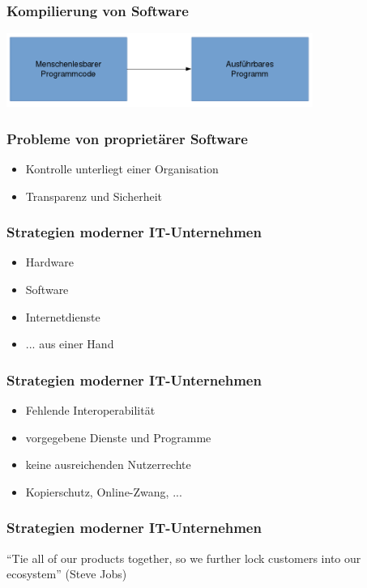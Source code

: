 \documentclass[12pt]{beamer}
\begin{document}
\begin{frame}
  \frametitle{Kompilierung von Software}
  \begin{center}
    \includegraphics[width=10cm]{img/compilation-process}
  \par\end{center}
\end{frame}

\begin{frame}
  \frametitle{Probleme von proprietärer Software}
  \begin{itemize}
    \item<2-> Kontrolle unterliegt einer Organisation
    \item<3-> Transparenz und Sicherheit
  \end{itemize}
\end{frame}

\begin{frame}
  \frametitle{Strategien moderner IT-Unternehmen}
  \begin{itemize}
    \item<2-> Hardware
    \item<3-> Software
    \item<4-> Internetdienste
    \item<5-> ... aus einer Hand
  \end{itemize}
\end{frame}

\begin{frame}
  \frametitle{Strategien moderner IT-Unternehmen}
  \begin{itemize}
    \item<2-> Fehlende Interoperabilität
    \item<3-> vorgegebene Dienste und Programme
    \item<4-> keine ausreichenden Nutzerrechte
    \item<5-> Kopierschutz, Online-Zwang, ...
  \end{itemize}
\end{frame}

\begin{frame}
  \frametitle{Strategien moderner IT-Unternehmen}
  \begin{center}
    ``Tie all of our products together, so we further lock customers into our ecosystem'' (Steve Jobs)
  \end{center}
\end{frame}
\end{document}
